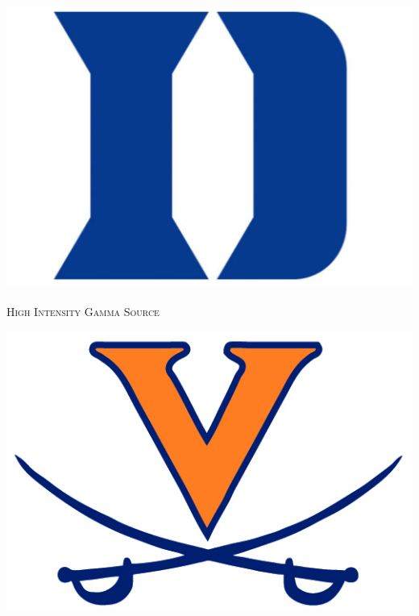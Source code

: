 \begin{titlepage}
\begin{center}

\noindent\begin{minipage}{.25\textwidth}
\centering
\includegraphics[width=\linewidth]{./img/duke-logo.png}~\\[.5cm]
\textsc{\normalsize High Intensity Gamma Source}\\[1.5cm]
\end{minipage}
\hfill
\noindent\begin{minipage}{.48\textwidth}
\centering
\includegraphics[width=\linewidth]{./img/uva-logo.png}~\\[.5cm]

\end{minipage}
\end{center}
\end{titlepage}
